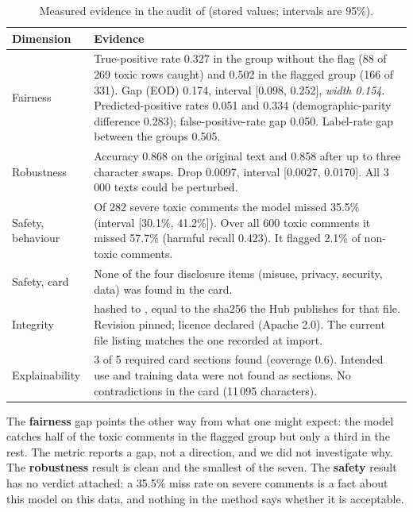 \begin{table}[!htbp]
\centering\small
\caption{Measured evidence in the audit of  (stored values; intervals are 95\%).}\label{tab:exevidence}
\begin{tabularx}{\textwidth}{|>{\raggedright\arraybackslash}p{2.8cm}|L|}
\hline
\textbf{Dimension} & \textbf{Evidence}\\
\hline
Fairness & True-positive rate 0.327 in the group without the flag (88 of 269 toxic rows caught) and 0.502 in the flagged group (166 of 331). Gap (EOD) 0.174, interval [0.098, 0.252], \emph{width 0.154}. Predicted-positive rates 0.051 and 0.334 (demographic-parity difference 0.283); false-positive-rate gap 0.050. Label-rate gap between the groups 0.505.\\ \hline
Robustness & Accuracy 0.868 on the original text and 0.858 after up to three character swaps. Drop 0.0097, interval [0.0027, 0.0170]. All 3\,000 texts could be perturbed.\\ \hline
Safety, behaviour & Of 282 severe toxic comments the model missed 35.5\% (interval [30.1\%, 41.2\%]). Over all 600 toxic comments it missed 57.7\% (harmful recall 0.423). It flagged 2.1\% of non-toxic comments.\\ \hline
Safety, card & None of the four disclosure items (misuse, privacy, security, data) was found in the card.\\ \hline
Integrity &  hashed to , equal to the sha256 the Hub publishes for that file. Revision pinned; licence declared (Apache 2.0). The current file listing matches the one recorded at import.\\ \hline
Explainability & 3 of 5 required card sections found (coverage 0.6). Intended use and training data were not found as sections. No contradictions in the card (11\,095 characters).\\
\hline
\end{tabularx}
\end{table}

The \textbf{fairness} gap points the other way from what one might expect: the model catches half of the toxic comments in the flagged group but only a third in the rest. The metric reports a gap, not a direction, and we did not investigate why. The \textbf{robustness} result is clean and the smallest of the seven. The \textbf{safety} result has no verdict attached: a 35.5\% miss rate on severe comments is a fact about this model on this data, and nothing in the method says whether it is acceptable.

